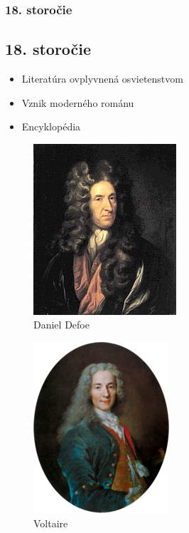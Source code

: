 \documentclass[dvipsnames]{beamer}
\begin{document}
\begin{frame}

\frametitle{18. storočie}
\subsection{18. storočie}
\begin{itemize}
	\item Literatúra ovplyvnená osvietenstvom
	\item Vznik moderného románu
	\item Encyklopédia
\end{itemize}
\begin{minipage}[t]{0.5\textwidth}
	\kern0pt
	\begin{figure}
		\includegraphics[scale=0.4]{defoe}
		\caption{Daniel Defoe}
	\end{figure}
\end{minipage}%
\begin{minipage}[t]{0.5\textwidth}
	\kern0pt
	\begin{figure}
		\includegraphics[scale=0.4]{voltik}
		\caption{Voltaire}
	\end{figure}
\end{minipage}


\end{frame}
\end{document}
